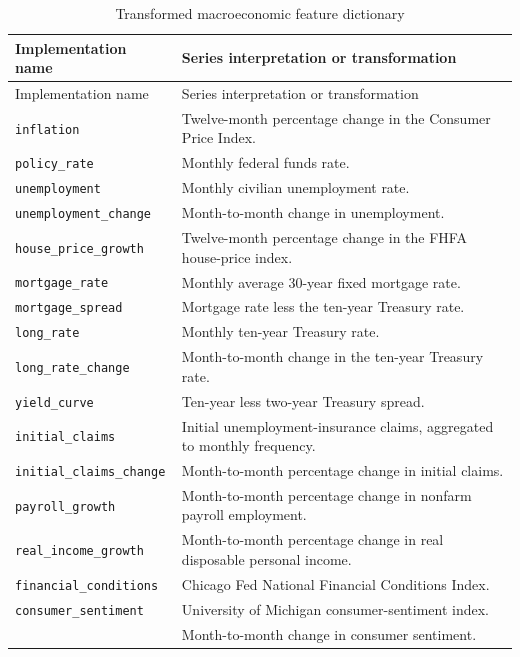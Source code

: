 \begin{longtable}{L{0.31\textwidth}L{0.60\textwidth}}
\caption{Transformed macroeconomic feature dictionary}\label{tab:macro-data-dictionary}\\
\toprule
Implementation name & Series interpretation or transformation \\
\midrule
\endfirsthead
\toprule
Implementation name & Series interpretation or transformation \\
\midrule
\endhead
\bottomrule
\endfoot
\texttt{inflation} & Twelve-month percentage change in the Consumer Price Index. \\
\texttt{policy\_rate} & Monthly federal funds rate. \\
\texttt{unemployment} & Monthly civilian unemployment rate. \\
\texttt{unemployment\_change} & Month-to-month change in unemployment. \\
\texttt{house\_price\_growth} & Twelve-month percentage change in the FHFA house-price index. \\
\texttt{mortgage\_rate} & Monthly average 30-year fixed mortgage rate. \\
\texttt{mortgage\_spread} & Mortgage rate less the ten-year Treasury rate. \\
\texttt{long\_rate} & Monthly ten-year Treasury rate. \\
\texttt{long\_rate\_change} & Month-to-month change in the ten-year Treasury rate. \\
\texttt{yield\_curve} & Ten-year less two-year Treasury spread. \\
\texttt{initial\_claims} & Initial unemployment-insurance claims, aggregated to monthly frequency. \\
\texttt{initial\_claims\_change} & Month-to-month percentage change in initial claims. \\
\texttt{payroll\_growth} & Month-to-month percentage change in nonfarm payroll employment. \\
\texttt{real\_income\_growth} & Month-to-month percentage change in real disposable personal income. \\
\texttt{financial\_conditions} & Chicago Fed National Financial Conditions Index. \\
\texttt{consumer\_sentiment} & University of Michigan consumer-sentiment index. \\
 & Month-to-month change in consumer sentiment. \\
\end{longtable}

